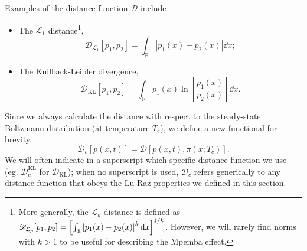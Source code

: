 \documentclass[hyperref={colorlinks=true, urlcolor=blue, citecolor=blue, final, bound}]{sfuthesis}
\newcommand{\kB}{k_{\mathrm{B}}}
\begin{document}
Examples of the distance function $\mathscr D$ include
\begin{itemize}
    \item The $\mathcal L_1$ distance\footnote{More generally, the $\mathcal L_k$ distance is defined as $\mathscr D_{\mathcal L_p}[p_1,p_2]=\left[ \int_{\mathbb R} \abs{p_1(x)-p_2(x)}^k\dd{x} \right]^{1/k}$. However, we will rarely find norms with $k>1$ to be useful for describing the Mpemba effect.}, 
    \begin{equation}
        \mathscr D_{\mathcal L_1}[p_1,p_2] = \int_{\mathbb R} |p_1(x)-p_2(x)|\dd{x};\label{eq:L1definition}
    \end{equation}
    \item The Kullback-Leibler divergence, 
    \begin{equation}
        \mathscr D_{\mathrm{KL}}[p_1,p_2] = \int_{\mathbb R} p_1(x)\ln\left[ \frac{p_1(x)}{p_2(x)} \right]\dd{x}.\label{eq:KLdefinition}
    \end{equation}
\end{itemize}

Since we always calculate the distance with respect to the steady-state Boltzmann distribution (at temperature $T_c$), we define a new functional for brevity, 
\begin{equation}
    \mathcal D_c[p(x,t)] = \mathscr D[p(x,t),\pi(x;T_c)].
\end{equation}
We will often indicate in a superscript which specific distance function we use (eg. $\mathcal D_c^{\mathrm{KL}}$ for $\mathscr D_{\mathrm{KL}}$); when no superscript is used, $\mathcal D_c$ refers generically to any distance function that obeys the Lu-Raz properties we defined in this section.
\end{document}
